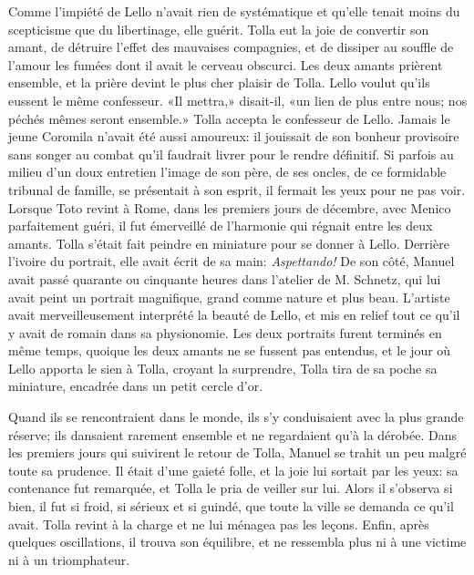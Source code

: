 Comme l'impiété de Lello n'avait rien de systématique et qu'elle tenait
moins du scepticisme que du libertinage, elle guérit. Tolla eut la joie
de convertir son amant, de détruire l'effet des mauvaises compagnies, et
de dissiper au souffle de l'amour les fumées dont il avait le cerveau
obscurci. Les deux amants prièrent ensemble, et la prière devint le plus
cher plaisir de Tolla. Lello voulut qu'ils eussent le même confesseur.
«Il mettra,» disait-il, «un lien de plus entre nous; nos péchés mêmes
seront ensemble.» Tolla accepta le confesseur de Lello. Jamais le jeune
Coromila n'avait été aussi amoureux: il jouissait de son bonheur
provisoire sans songer au combat qu'il faudrait livrer pour le rendre
définitif. Si parfois au milieu d'un doux entretien l'image de son père,
de ses oncles, de ce formidable tribunal de famille, se présentait à son
esprit, il fermait les yeux pour ne pas voir. Lorsque Toto revint à
Rome, dans les premiers jours de décembre, avec Menico parfaitement
guéri, il fut émerveillé de l'harmonie qui régnait entre les deux
amants. Tolla s'était fait peindre en miniature pour se donner à Lello.
Derrière l'ivoire du portrait, elle avait écrit de sa main:
\emph{Aspettando!} De son côté, Manuel avait passé quarante ou cinquante
heures dans l'atelier de M. Schnetz, qui lui avait peint un portrait
magnifique, grand comme nature et plus beau. L'artiste avait
merveilleusement interprété la beauté de Lello, et mis en relief tout ce
qu'il y avait de romain dans sa physionomie. Les deux portraits furent
terminés en même temps, quoique les deux amants ne se fussent pas
entendus, et le jour où Lello apporta le sien à Tolla, croyant la
surprendre, Tolla tira de sa poche sa miniature, encadrée dans un petit
cercle d'or.

Quand ils se rencontraient dans le monde, ils s'y conduisaient avec la
plus grande réserve; ils dansaient rarement ensemble et ne regardaient
qu'à la dérobée. Dans les premiers jours qui suivirent le retour de
Tolla, Manuel se trahit un peu malgré toute sa prudence. Il était d'une
gaieté folle, et la joie lui sortait par les yeux: sa contenance fut
remarquée, et Tolla le pria de veiller sur lui. Alors il s'observa si
bien, il fut si froid, si sérieux et si guindé, que toute la ville se
demanda ce qu'il avait. Tolla revint à la charge et ne lui ménagea pas
les leçons. Enfin, après quelques oscillations, il trouva son équilibre,
et ne ressembla plus ni à une victime ni à un triomphateur.

